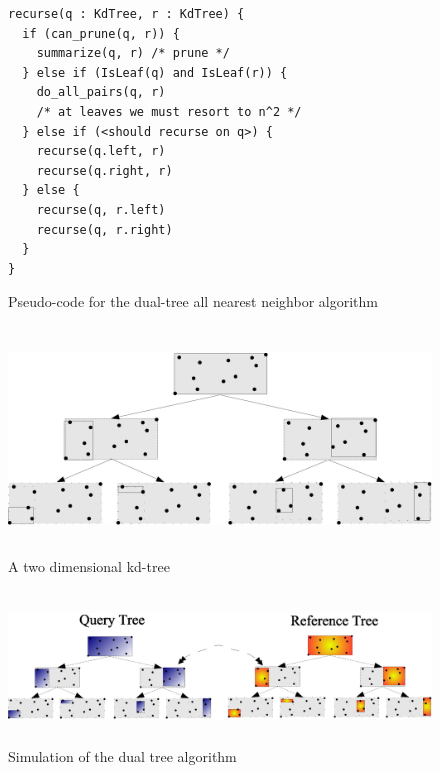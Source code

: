 \documentclass[12pt,letterpaper,doublespaced,ETD,dvips,proposal]{gtthesis}
\begin{document}
\begin{Body}

\begin{figure}[!htb]
\begin{boxedminipage}[c]{\linewidth}
\begin{verbatim}
recurse(q : KdTree, r : KdTree) {
  if (can_prune(q, r)) {
    summarize(q, r) /* prune */
  } else if (IsLeaf(q) and IsLeaf(r)) {
    do_all_pairs(q, r)
    /* at leaves we must resort to n^2 */
  } else if (<should recurse on q>) {
    recurse(q.left, r)
    recurse(q.right, r)
  } else {
    recurse(q, r.left)
    recurse(q, r.right)
  }
}
\end{verbatim}
\end{boxedminipage}
\caption{Pseudo-code for the dual-tree all nearest neighbor
algorithm} \label{dualtree_algorithm}
\end{figure}


\begin{figure}[!htb]
\label{kdtree}
\centerline{\includegraphics[height=6cm]{kdtree.eps}}
\caption{A two dimensional kd-tree}
\end{figure}


\begin{figure}[!htb]
\label{dualkdtree}
\centerline{\includegraphics[height=4cm]{dualtree_recursion.eps}}
\caption{Simulation of the dual tree algorithm}
\end{figure}


\end{Body}
\end{document}
